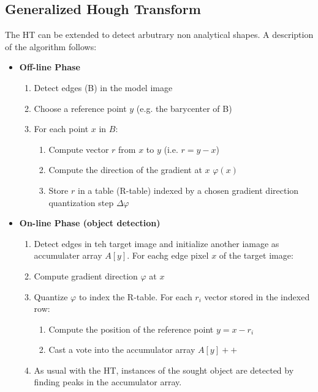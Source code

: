 \documentclass{article}
\begin{document}
\subsection{Generalized Hough Transform}
The HT can be extended to detect arbutrary non analytical shapes. A description of the algorithm follows:
\begin{itemize}
    \item \textbf{Off-line Phase}
        \begin{enumerate}
            \item Detect edges (B) in the model image
            \item Choose a reference point $y$ (e.g. the barycenter of B) 
            \item For each point $x$ in $B$:
                \begin{enumerate}
                    \item Compute vector $r$ from $x$ to $y$ (i.e. $r=y-x$) 
                    \item Compute the direction of the gradient at $x$ $\varphi(x)$ 
                    \item Store $r$ in a table (R-table) indexed by a chosen gradient direction quantization step $\Delta\varphi$
                \end{enumerate}
        \end{enumerate} 
    \item \textbf{On-line Phase (object detection)} 
    \begin{enumerate}
        \item Detect edges in teh target image and initialize another iamage as accumulater array $A[y]$. For eachg edge pixel $x$ of the target image:
        \item Compute gradient direction $\varphi$ at $x$ 
        \item Quantize $\varphi$ to index the R-table. For each $r_i$ vector stored in the indexed row:
            \begin{enumerate}
                \item Compute the position of the reference point $y=x-r_i$ 
                \item Cast a vote into the accumulator array $A[y]++$ 
            \end{enumerate}
        \item As usual with the HT, instances of the sought object are detected by finding peaks in the accumulator array.
    \end{enumerate}
\end{itemize}
\end{document}
